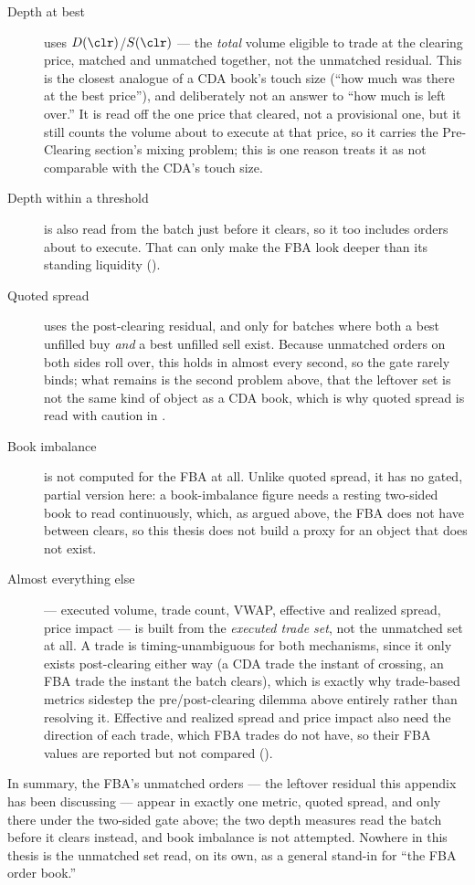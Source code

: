 \begin{description}
  \item[Depth at best] uses $D(\clr)$/$S(\clr)$ --- the \emph{total}
  volume eligible to trade at the clearing price, matched and unmatched
  together, not the unmatched residual. This is the closest analogue of a
  CDA book's touch size (``how much was there at the best price''), and
  deliberately not an answer to ``how much is left over.'' It is read off
  the one price that cleared, not a provisional one, but it still
  counts the volume about to execute at that price, so it carries the
  Pre-Clearing section's mixing problem; this is one reason
   treats it as not comparable with the CDA's touch size.
  \item[Depth within a threshold] is also read from the batch just before
  it clears, so it too includes orders about to execute. That can only
  make the FBA look deeper than its standing liquidity
  ().
  \item[Quoted spread] uses the post-clearing residual, and only for
  batches where both a best unfilled buy \emph{and} a best unfilled sell
  exist. Because unmatched orders on both sides roll over, this holds in
  almost every second, so the gate rarely binds; what remains is the
  second problem above, that the leftover set is not the same kind of
  object as a CDA book, which is why quoted spread is read with caution in
  .
  \item[Book imbalance] is not computed for the FBA at all. Unlike
  quoted spread, it has no gated, partial version here: a book-imbalance
  figure needs a resting two-sided book to read continuously, which, as
  argued above, the FBA does not have between clears, so this
  thesis does not build a proxy for an object that does not exist.
  \item[Almost everything else] --- executed volume, trade
  count, VWAP, effective and realized spread, price impact --- is built
  from the \emph{executed trade set}, not the unmatched set at all. A
  trade is timing-unambiguous for both mechanisms, since it only exists
  post-clearing either way (a CDA trade the instant of crossing, an FBA
  trade the instant the batch clears), which is exactly why trade-based
  metrics sidestep the pre/post-clearing dilemma above entirely rather
  than resolving it. Effective and realized spread and price impact also
  need the direction of each trade, which FBA trades do not have, so their
  FBA values are reported but not compared ().
\end{description}

In summary, the FBA's unmatched orders --- the leftover residual this
appendix has been discussing --- appear in exactly one metric, quoted
spread, and only there under the two-sided gate above; the two depth
measures read the batch before it clears instead, and book imbalance is
not attempted. Nowhere in this thesis is the unmatched set
read, on its own, as a general stand-in for ``the FBA order book.''
